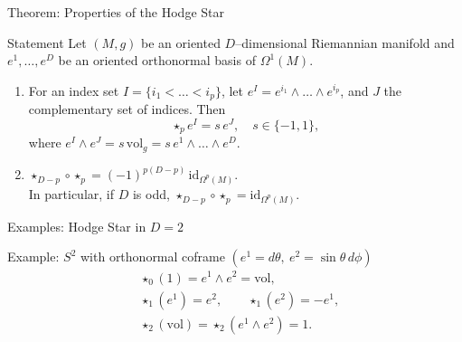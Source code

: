 \begin{frame}{Theorem: Properties of the Hodge Star}
\begin{block}{Statement}
Let $(M,g)$ be an oriented $D$–dimensional Riemannian manifold and
$e^1,\dots,e^D$ be an oriented orthonormal basis of $\Omega^1(M)$.
\begin{enumerate}
\item For an index set $I=\{i_1<\dots<i_p\}$,
let $e^I=e^{i_1}\wedge\dots\wedge e^{i_p}$,
and $J$ the complementary set of indices.
Then
\[
\star_p e^I=s\,e^J,\quad s\in\{-1,1\},
\]
where $e^I\wedge e^J=s\,\mathrm{vol}_g=s\,e^1\wedge\dots\wedge e^D$.
\item $\displaystyle \star_{D-p}\circ\star_p=(-1)^{p(D-p)}\,\mathrm{id}_{\Omega^p(M)}$.\\

In particular, if $D$ is odd, $\star_{D-p}\circ\star_p=\mathrm{id}_{\Omega^p(M)}$.
\end{enumerate}
\end{block}
\end{frame}

\begin{frame}{Examples: Hodge Star in $D=2$}
\begin{block}{Example: $S^2$ with orthonormal coframe $(e^1=d\theta,\ e^2=\sin\theta\,d\phi)$}
\[
\begin{aligned}
&\star_0(1)=e^1\wedge e^2=\mathrm{vol},\\
&\star_1(e^1)=e^2,\qquad \star_1(e^2)=-e^1,\\
&\star_2(\mathrm{vol})=\star_2(e^1\wedge e^2)=1.
\end{aligned}
\]
\end{block}

\begin{center}
\end{center}
\end{frame}

